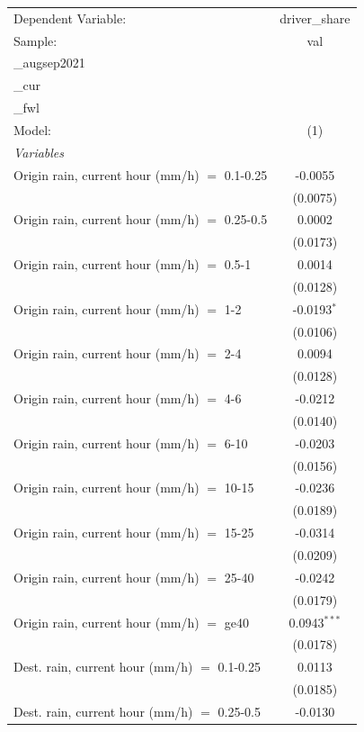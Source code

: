 \ifdefined\ifclassloaded
{}
\fi
\begingroup
\centering
\begin{tabular}{lc}
   \tabularnewline \midrule \midrule
   Dependent Variable: & driver\_share\\
   Sample: & val\\_augsep2021\\_cur\\_fwl \\
   Model: & (1)\\
   \midrule
   \emph{Variables}\\
   Origin rain, current hour (mm/h) $=$ 0.1-0.25 & -0.0055\\
    & (0.0075)\\
   Origin rain, current hour (mm/h) $=$ 0.25-0.5 & 0.0002\\
    & (0.0173)\\
   Origin rain, current hour (mm/h) $=$ 0.5-1 & 0.0014\\
    & (0.0128)\\
   Origin rain, current hour (mm/h) $=$ 1-2 & -0.0193$^{*}$\\
    & (0.0106)\\
   Origin rain, current hour (mm/h) $=$ 2-4 & 0.0094\\
    & (0.0128)\\
   Origin rain, current hour (mm/h) $=$ 4-6 & -0.0212\\
    & (0.0140)\\
   Origin rain, current hour (mm/h) $=$ 6-10 & -0.0203\\
    & (0.0156)\\
   Origin rain, current hour (mm/h) $=$ 10-15 & -0.0236\\
    & (0.0189)\\
   Origin rain, current hour (mm/h) $=$ 15-25 & -0.0314\\
    & (0.0209)\\
   Origin rain, current hour (mm/h) $=$ 25-40 & -0.0242\\
    & (0.0179)\\
   Origin rain, current hour (mm/h) $=$ ge40 & 0.0943$^{***}$\\
    & (0.0178)\\
   Dest. rain, current hour (mm/h) $=$ 0.1-0.25 & 0.0113\\
    & (0.0185)\\
   Dest. rain, current hour (mm/h) $=$ 0.25-0.5 & -0.0130\\

\end{tabular}

